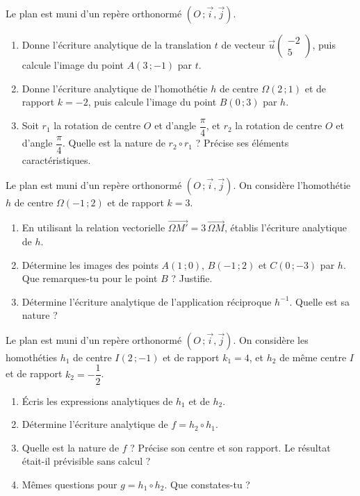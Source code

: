 \documentclass[11pt]{article}
\newcounter{popsec}
\newcounter{popsub}
\newcommand{\courssub}[1]{%
  \stepcounter{popsub}%
  \par\vspace{9pt}\noindent{\popxbold\fontsize{11.5}{13}\selectfont\color{popink}{\color{poporange}\thepopsec.\thepopsub}\hspace{6pt}#1}\par\nopagebreak\vspace{4pt}
}
\begin{document}
\begin{exercice}
Le plan est muni d'un repère orthonormé $(O\,;\vec{i},\vec{j})$.
\begin{enumerate}
\item Donne l'écriture analytique de la translation $t$ de vecteur $\vec{u}\begin{pmatrix} -2 \\ 5 \end{pmatrix}$, puis calcule l'image du point $A(3\,;-1)$ par $t$.
\item Donne l'écriture analytique de l'homothétie $h$ de centre $\Omega(2\,;1)$ et de rapport $k = -2$, puis calcule l'image du point $B(0\,;3)$ par $h$.
\item Soit $r_1$ la rotation de centre $O$ et d'angle $\dfrac{\pi}{4}$, et $r_2$ la rotation de centre $O$ et d'angle $\dfrac{\pi}{4}$. Quelle est la nature de $r_2 \circ r_1$ ? Précise ses éléments caractéristiques.
\end{enumerate}
\end{exercice}

\courssub{Je m'entraîne}

\begin{exercice}
Le plan est muni d'un repère orthonormé $(O\,;\vec{i},\vec{j})$. On considère l'homothétie $h$ de centre $\Omega(-1\,;2)$ et de rapport $k = 3$.
\begin{enumerate}
\item En utilisant la relation vectorielle $\overrightarrow{\Omega M'} = 3\,\overrightarrow{\Omega M}$, établis l'écriture analytique de $h$.
\item Détermine les images des points $A(1\,;0)$, $B(-1\,;2)$ et $C(0\,;-3)$ par $h$. Que remarques-tu pour le point $B$ ? Justifie.
\item Détermine l'écriture analytique de l'application réciproque $h^{-1}$. Quelle est sa nature ?
\end{enumerate}
\end{exercice}

\begin{exercice}
Le plan est muni d'un repère orthonormé $(O\,;\vec{i},\vec{j})$. On considère les homothéties $h_1$ de centre $I(2\,;-1)$ et de rapport $k_1 = 4$, et $h_2$ de même centre $I$ et de rapport $k_2 = -\dfrac{1}{2}$.
\begin{enumerate}
\item Écris les expressions analytiques de $h_1$ et de $h_2$.
\item Détermine l'écriture analytique de $f = h_2 \circ h_1$.
\item Quelle est la nature de $f$ ? Précise son centre et son rapport. Le résultat était-il prévisible sans calcul ?
\item Mêmes questions pour $g = h_1 \circ h_2$. Que constates-tu ?
\end{enumerate}
\end{exercice}
\end{document}
